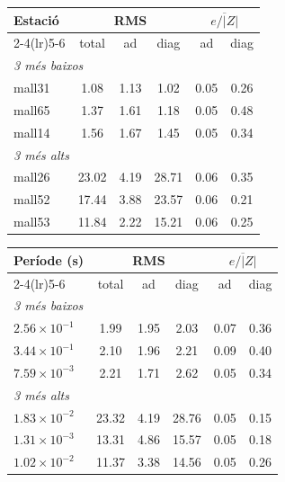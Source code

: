 \documentclass[11pt,a4paper,oneside]{article}
\begin{document}
\noindent
\begin{minipage}[t]{0.49\textwidth}
  \vspace{0pt}
  \centering
  \footnotesize
  \setlength{\tabcolsep}{3pt}
  \captionsetup{hypcap=false}
  \begin{tabular}{@{}lccccc@{}}
    \toprule
    Estació & \multicolumn{3}{c}{RMS} & \multicolumn{2}{c}{$\overline{e/|Z|}$} \\
    \cmidrule(lr){2-4}\cmidrule(lr){5-6}
     & total & ad & diag & ad & diag \\
    \midrule
    \multicolumn{6}{l}{\textit{3 més baixos}} \\
    mall31 & 1.08 & 1.13 & 1.02 & 0.05 & 0.26 \\
    mall65 & 1.37 & 1.61 & 1.18 & 0.05 & 0.48 \\
    mall14 & 1.56 & 1.67 & 1.45 & 0.05 & 0.34 \\
    \midrule
    \multicolumn{6}{l}{\textit{3 més alts}} \\
    mall26 & 23.02 & 4.19 & 28.71 & 0.06 & 0.35 \\
    mall52 & 17.44 & 3.88 & 23.57 & 0.06 & 0.21 \\
    mall53 & 11.84 & 2.22 & 15.21 & 0.06 & 0.25 \\
    \bottomrule
  \end{tabular}
  \label{tab:rms-estacions-ext}
\end{minipage}\hfill
\begin{minipage}[t]{0.49\textwidth}
  \vspace{0pt}
  \centering
  \footnotesize
  \setlength{\tabcolsep}{3pt}
  \captionsetup{hypcap=false}
  \begin{tabular}{@{}lccccc@{}}
    \toprule
    Període (s) & \multicolumn{3}{c}{RMS} & \multicolumn{2}{c}{$\overline{e/|Z|}$} \\
    \cmidrule(lr){2-4}\cmidrule(lr){5-6}
     & total & ad & diag & ad & diag \\
    \midrule
    \multicolumn{6}{l}{\textit{3 més baixos}} \\
    $2.56\times10^{-1}$ & 1.99 & 1.95 & 2.03 & 0.07 & 0.36 \\
    $3.44\times10^{-1}$ & 2.10 & 1.96 & 2.21 & 0.09 & 0.40 \\
    $7.59\times10^{-3}$ & 2.21 & 1.71 & 2.62 & 0.05 & 0.34 \\
    \midrule
    \multicolumn{6}{l}{\textit{3 més alts}} \\
    $1.83\times10^{-2}$ & 23.32 & 4.19 & 28.76 & 0.05 & 0.15 \\
    $1.31\times10^{-3}$ & 13.31 & 4.86 & 15.57 & 0.05 & 0.18 \\
    $1.02\times10^{-2}$ & 11.37 & 3.38 & 14.56 & 0.05 & 0.26 \\
    \bottomrule
  \end{tabular}
  \label{tab:rms-periodes-ext}
\end{minipage}
\end{document}
